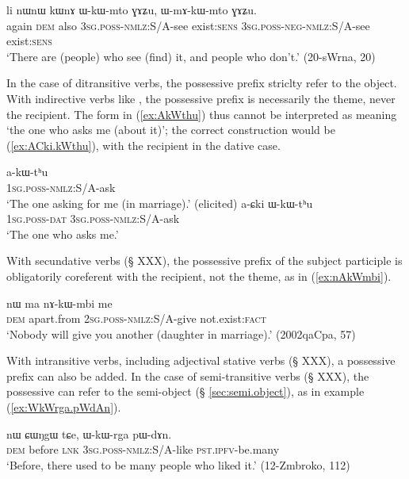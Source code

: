  \begin{exe} 
\ex \label{ex:WmAkWmto} 
\gll  li nɯnɯ kɯnɤ ɯ-kɯ-mto ɣɤʑu, ɯ-mɤ-kɯ-mto ɣɤʑu. \\
again \textsc{dem} also \textsc{3sg}.\textsc{poss}-\textsc{nmlz}:S/A-see exist:\textsc{sens} \textsc{3sg}.\textsc{poss}-\textsc{neg}-\textsc{nmlz}:S/A-see exist:\textsc{sens} \\
\glt `There are (people) who see (find) it, and people who don't.' (20-sWrna, 20)
\end{exe}

In the case of ditransitive verbs, the possessive prefix striclty refer to the object. With indirective verbs like , the possessive prefix is necessarily the theme, never the recipient. The form in (\ref{ex:AkWthu}) thus cannot be interpreted as meaning `the one who asks me (about it)'; the correct construction would be (\ref{ex:ACki.kWthu}), with the recipient in the dative case.

\begin{exe}
\ex \label{ex:AkWthu}
\gll a-kɯ-tʰu  \\
\textsc{1sg.poss}-\textsc{nmlz}:S/A-ask \\
\glt `The one asking for me (in marriage).' (elicited)
\ex \label{ex:ACki.kWthu}
\gll a-ɕki ɯ-kɯ-tʰu  \\
\textsc{1sg.poss}-\textsc{dat} \textsc{3sg}.\textsc{poss}-\textsc{nmlz}:S/A-ask \\ 
\glt `The one who asks me.' 
\end{exe}

With secundative verbs (§ XXX), the possessive prefix of the subject participle is obligatorily coreferent with the recipient, not the theme, as in (\ref{ex:nAkWmbi}).

\begin{exe}
\ex \label{ex:nAkWmbi}
\gll nɯ ma nɤ-kɯ-mbi me \\
\textsc{dem} apart.from \textsc{2sg}.\textsc{poss}-\textsc{nmlz}:S/A-give not.exist:\textsc{fact} \\
\glt `Nobody will give you another (daughter in marriage).' (2002qaCpa, 57)
\end{exe}
With intransitive verbs, including adjectival stative verbs (§ XXX), a possessive prefix can also be added. In the case of semi-transitive verbs (§ XXX), the possessive can refer to the semi-object (§ \ref{sec:semi.object}), as in example (\ref{ex:WkWrga.pWdAn}).

 \begin{exe} 
\ex \label{ex:WkWrga.pWdAn}
\gll  nɯ ɕɯŋgɯ tɕe, ɯ-kɯ-rga pɯ-dɤn. \\
\textsc{dem} before \textsc{lnk} \textsc{3sg}.\textsc{poss}-\textsc{nmlz}:S/A-like \textsc{pst}.\textsc{ipfv}-be.many \\
\glt  `Before, there used to be many people who liked it.' (12-Zmbroko, 112)
\end{exe}

